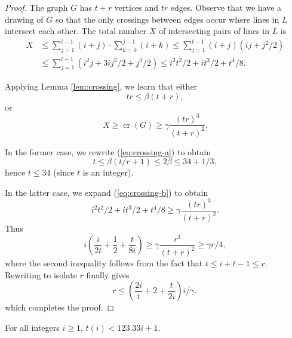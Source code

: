 \documentclass{ws-ijcga}
\DeclareMathOperator{\cn}{cr}
\begin{document}
\begin{proof}
The graph $G$ has $t+r$ vertices
and $tr$ edges.  Observe that we have a drawing of $G$ so that the only
crossings between edges occur where lines in $L$ intersect each other.
The total number $X$ of intersecting pairs of lines in $L$ is
\[
  \begin{aligned}
    X 
      & \le \sum_{j=1}^{t-1}(i+j)\cdot\sum_{k=0}^{j-1}(i+k)
       \le \sum_{j=1}^{t-1}(i+j)(ij + j^2/2) \\
      & \le \sum_{j=1}^{t-1}(i^2j+3ij^2/2 + j^3/2) 
       \le i^2t^2/2 + it^3/2 + t^4/8.
  \end{aligned}
\]

Applying Lemma \ref{lem:crossing}, we learn that either
\begin{equation}
   tr \le \beta (t+r), \label{eq:crossing-a}
\end{equation}
or
\begin{equation}
   X \ge \cn(G) \ge \gamma \frac{(tr)^3}{(t+r)^2} \label{eq:crossing-b}.
\end{equation}

In the former case, we rewrite (\ref{eq:crossing-a}) to obtain
\[
   t \le \beta(t/r + 1) \le 2\beta \le 34 + 1/3,
\]
hence $t\le 34$ (since $t$ is an integer).

In the latter case, we expand (\ref{eq:crossing-b}) to obtain
\[ i^2t^2/2 + it^3/2 + t^4/8 \ge \gamma\frac{(tr)^3}{(t+r)^2} .  \]
Thus
\[ i\left(\frac{i}{2t} 
    + \frac{1}{2}+\frac{t}{8i}\right) 
      \ge \gamma \frac{r^3}{(t+r)^2} \ge \gamma r/ 4,
\]
where the second inequality follows from the fact that $t\le i+t-1 \le r$.
Rewriting to isolate $r$ finally gives
\[
  r \le \left(\frac{2i}{t} + 2 +\frac{t}{2i}\right)i/\gamma,
\]
which completes the proof.
\end{proof}


\begin{lemma}\label{lem:upper-bound}
For all integers $i\ge 1$, $t(i) < 123.33i+1$.
\end{lemma}
\end{document}

